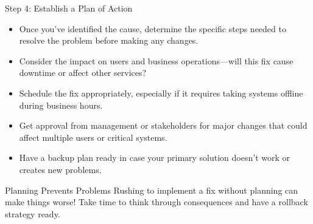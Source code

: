 \documentclass[aspectratio=169]{beamer}
\begin{document}
\begin{frame}{Step 4: Establish a Plan of Action}

\begin{itemize}
    \item Once you've identified the cause, determine the specific steps needed to resolve the problem before making any changes.
    \item Consider the impact on users and business operations—will this fix cause downtime or affect other services?
    \item Schedule the fix appropriately, especially if it requires taking systems offline during business hours.
    \item Get approval from management or stakeholders for major changes that could affect multiple users or critical systems.
    \item Have a backup plan ready in case your primary solution doesn't work or creates new problems.
\end{itemize}

\vspace{0.3cm}

\begin{alertblock}{Planning Prevents Problems}
Rushing to implement a fix without planning can make things worse! Take time to think through consequences and have a rollback strategy ready.
\end{alertblock}

\end{frame}
\end{document}
